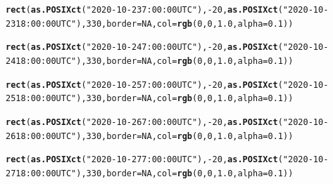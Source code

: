 \documentclass{article}\usepackage[]{graphicx}\usepackage[]{color}
\makeatletter
\newcommand{\hlnum}[1]{\textcolor[rgb]{0.686,0.059,0.569}{#1}}%
\newcommand{\hlstr}[1]{\textcolor[rgb]{0.192,0.494,0.8}{#1}}%
\newcommand{\hlopt}[1]{\textcolor[rgb]{0,0,0}{#1}}%
\newcommand{\hlstd}[1]{\textcolor[rgb]{0.345,0.345,0.345}{#1}}%
\newcommand{\hlkwc}[1]{\textcolor[rgb]{0.333,0.667,0.333}{#1}}%
\newcommand{\hlkwd}[1]{\textcolor[rgb]{0.737,0.353,0.396}{\textbf{#1}}}%
\newenvironment{kframe}{%
 \def\at@end@of@kframe{}%
 \ifinner\ifhmode%
  \def\at@end@of@kframe{\end{minipage}}%
  \begin{minipage}{\columnwidth}%
 \fi\fi%
 \def\FrameCommand##1{\hskip\@totalleftmargin \hskip-\fboxsep
 \colorbox{shadecolor}{##1}\hskip-\fboxsep
     \hskip-\linewidth \hskip-\@totalleftmargin \hskip\columnwidth}%
 \MakeFramed {\advance\hsize-\width
   \@totalleftmargin\z@ \linewidth\hsize
   \@setminipage}}%
 {\par\unskip\endMakeFramed%
 \at@end@of@kframe}
\newenvironment{knitrout}{}{} %
\makeatother
\begin{document}
\begin{knitrout}
\begin{kframe}
\begin{alltt}
\hlkwd{rect}\hlstd{(}\hlkwd{as.POSIXct}\hlstd{(}\hlstr{"2020-10-23 7:00:00 UTC"}\hlstd{),} \hlopt{-}\hlnum{20}\hlstd{,} \hlkwd{as.POSIXct}\hlstd{(}\hlstr{"2020-10-23 18:00:00 UTC"}\hlstd{),} \hlnum{330}\hlstd{,} \hlkwc{border} \hlstd{=} \hlnum{NA}\hlstd{,} \hlkwc{col}\hlstd{=} \hlkwd{rgb}\hlstd{(}\hlnum{0}\hlstd{,}\hlnum{0}\hlstd{,}\hlnum{1.0}\hlstd{,}\hlkwc{alpha}\hlstd{=}\hlnum{0.1}\hlstd{))}

\hlkwd{rect}\hlstd{(}\hlkwd{as.POSIXct}\hlstd{(}\hlstr{"2020-10-24 7:00:00 UTC"}\hlstd{),} \hlopt{-}\hlnum{20}\hlstd{,} \hlkwd{as.POSIXct}\hlstd{(}\hlstr{"2020-10-24 18:00:00 UTC"}\hlstd{),} \hlnum{330}\hlstd{,} \hlkwc{border} \hlstd{=} \hlnum{NA}\hlstd{,} \hlkwc{col}\hlstd{=} \hlkwd{rgb}\hlstd{(}\hlnum{0}\hlstd{,}\hlnum{0}\hlstd{,}\hlnum{1.0}\hlstd{,}\hlkwc{alpha}\hlstd{=}\hlnum{0.1}\hlstd{))}

\hlkwd{rect}\hlstd{(}\hlkwd{as.POSIXct}\hlstd{(}\hlstr{"2020-10-25 7:00:00 UTC"}\hlstd{),} \hlopt{-}\hlnum{20}\hlstd{,} \hlkwd{as.POSIXct}\hlstd{(}\hlstr{"2020-10-25 18:00:00 UTC"}\hlstd{),} \hlnum{330}\hlstd{,} \hlkwc{border} \hlstd{=} \hlnum{NA}\hlstd{,} \hlkwc{col}\hlstd{=} \hlkwd{rgb}\hlstd{(}\hlnum{0}\hlstd{,}\hlnum{0}\hlstd{,}\hlnum{1.0}\hlstd{,}\hlkwc{alpha}\hlstd{=}\hlnum{0.1}\hlstd{))}

\hlkwd{rect}\hlstd{(}\hlkwd{as.POSIXct}\hlstd{(}\hlstr{"2020-10-26 7:00:00 UTC"}\hlstd{),} \hlopt{-}\hlnum{20}\hlstd{,} \hlkwd{as.POSIXct}\hlstd{(}\hlstr{"2020-10-26 18:00:00 UTC"}\hlstd{),} \hlnum{330}\hlstd{,} \hlkwc{border} \hlstd{=} \hlnum{NA}\hlstd{,} \hlkwc{col}\hlstd{=} \hlkwd{rgb}\hlstd{(}\hlnum{0}\hlstd{,}\hlnum{0}\hlstd{,}\hlnum{1.0}\hlstd{,}\hlkwc{alpha}\hlstd{=}\hlnum{0.1}\hlstd{))}

\hlkwd{rect}\hlstd{(}\hlkwd{as.POSIXct}\hlstd{(}\hlstr{"2020-10-27 7:00:00 UTC"}\hlstd{),} \hlopt{-}\hlnum{20}\hlstd{,} \hlkwd{as.POSIXct}\hlstd{(}\hlstr{"2020-10-27 18:00:00 UTC"}\hlstd{),} \hlnum{330}\hlstd{,} \hlkwc{border} \hlstd{=} \hlnum{NA}\hlstd{,} \hlkwc{col}\hlstd{=} \hlkwd{rgb}\hlstd{(}\hlnum{0}\hlstd{,}\hlnum{0}\hlstd{,}\hlnum{1.0}\hlstd{,}\hlkwc{alpha}\hlstd{=}\hlnum{0.1}\hlstd{))}


\end{alltt}
\end{kframe}
\end{knitrout}
\end{document}
